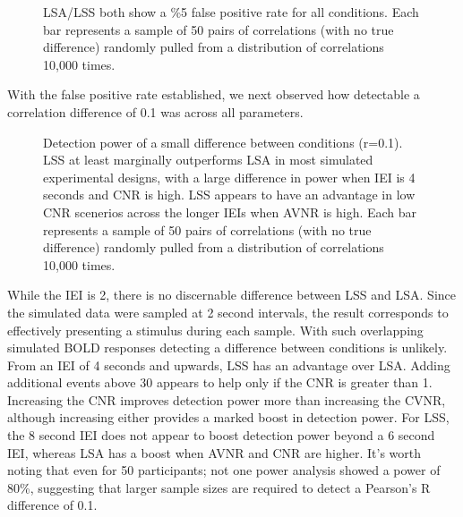 \documentclass[10pt,letterpaper]{article}
\begin{document}
\begin{figure}[H]
  \centering


  \caption{
    LSA/LSS both show a \%5 false positive rate for all conditions.
    Each bar represents a sample of 50 pairs of correlations (with no true difference)
    randomly pulled from a distribution of correlations 10,000 times.
  }
  \label{fig:res_sim_fpr}
\end{figure}

With the false positive rate established, we next observed how detectable a
correlation difference of 0.1 was across all parameters.

\begin{figure}[H]
  \centering


  \caption{
    Detection power of a small difference between conditions (r=0.1).
    LSS at least marginally outperforms LSA in most simulated experimental
    designs, with a large difference in power when IEI is 4 seconds and
    CNR is high.
    LSS appears to have an advantage in low CNR scenerios across the longer IEIs
    when AVNR is high.
    Each bar represents a sample of 50 pairs of correlations (with no true difference)
    randomly pulled from a distribution of correlations 10,000 times.
  }
  \label{fig:res_sim_smalldiff}
\end{figure}

While the IEI is 2, there is no discernable difference between LSS and LSA.
Since the simulated data were sampled at 2 second intervals, the result
corresponds to effectively presenting a stimulus during each sample.
With such overlapping simulated BOLD responses detecting a difference between conditions
is unlikely.
From an IEI of 4 seconds and upwards, LSS has an advantage over LSA.
Adding additional events above 30 appears to help only if the CNR is greater than 1.
Increasing the CNR improves detection power more than increasing the CVNR, although increasing either
provides a marked boost in detection power.
For LSS, the 8 second IEI does not appear to boost detection power beyond a 6 second IEI,
whereas LSA has a boost when AVNR and CNR are higher.
It's worth noting that even for 50 participants; not one power analysis showed
a power of 80\%, suggesting that larger sample sizes are required to detect a Pearson's R
difference of 0.1.
\end{document}
